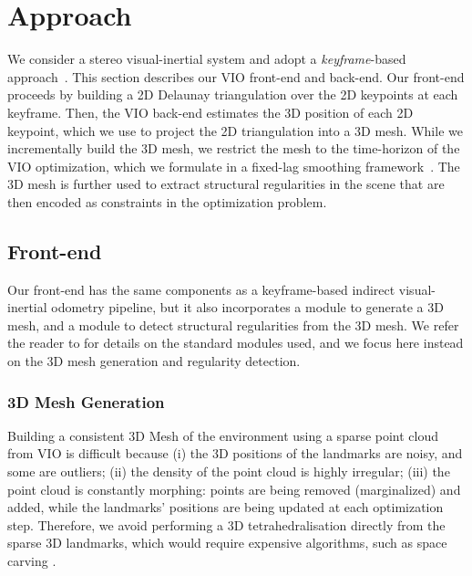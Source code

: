 
\section{Approach}
\label{sec:mathematical_formulation}

We consider a stereo visual-inertial system and adopt a \emph{keyframe}-based approach~\cite{Leutenegger15ijrr}.
This section describes our VIO front-end and back-end.
Our front-end proceeds by building a 2D Delaunay triangulation over the 2D keypoints at each keyframe.
Then, the VIO back-end estimates the 3D position of each 2D keypoint, which we use to project the 2D triangulation into a 3D mesh.
While we incrementally build the 3D mesh, we restrict the mesh to the time-horizon of the VIO optimization, which we formulate in a fixed-lag smoothing framework~\cite{Qin17arxiv, Carlone17icra-vioAttention}.
The 3D mesh is further used to extract structural regularities in the scene that are then encoded as constraints in the optimization problem.

\subsection{Front-end}
\label{ssec:frontend}

Our front-end has the same components as a keyframe-based indirect visual-inertial odometry pipeline\cite{Leutenegger15ijrr, Blosch15iros}, but it also incorporates a module to generate a 3D mesh, and a module to detect structural regularities from the 3D mesh.
We refer the reader to \cite[Sec. 4.2.1]{RosinolMT} for details on the standard modules used, and we focus here instead on the 3D mesh generation and regularity detection.

\subsubsection{3D Mesh Generation}
\label{sssec:3d_mesh_generation}

Building a consistent 3D Mesh of the environment using a sparse point cloud from VIO is difficult because (i) the 3D positions of the landmarks are noisy, and some are outliers; (ii) the density of the point cloud is highly irregular; (iii) the point cloud is constantly morphing: points are being removed (marginalized) and added, while the landmarks' positions are being updated at each optimization step.
Therefore, we avoid performing a 3D tetrahedralisation directly from the sparse 3D landmarks, which would require expensive algorithms, such as space carving \cite{Pan2009proforma}.

